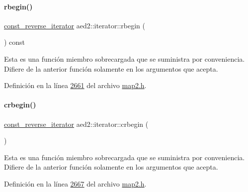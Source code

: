 \paragraph{\texorpdfstring{rbegin()}{rbegin()}\hspace{0.1cm}{\footnotesize\ttfamily [2/2]}}
{\footnotesize\ttfamily \hyperlink{classaed2_1_1iterator_a657402896e5b5966660032f5686cc4c4_a657402896e5b5966660032f5686cc4c4}{const\+\_\+reverse\+\_\+iterator} aed2\+::iterator\+::rbegin (\begin{DoxyParamCaption}{ }\end{DoxyParamCaption}) const\hspace{0.3cm}{\ttfamily [inline]}}

Esta es una función miembro sobrecargada que se suministra por conveniencia. Difiere de la anterior función solamente en los argumentos que acepta. 

Definición en la línea \hyperlink{map2_8h_source_l02661}{2661} del archivo \hyperlink{map2_8h_source}{map2.\+h}.

\mbox{\label{classaed2_1_1iterator_aa4b6ce667258581859351db42cfd3ee4_aa4b6ce667258581859351db42cfd3ee4}} 
\paragraph{\texorpdfstring{crbegin()}{crbegin()}}
{\footnotesize\ttfamily \hyperlink{classaed2_1_1iterator_a657402896e5b5966660032f5686cc4c4_a657402896e5b5966660032f5686cc4c4}{const\+\_\+reverse\+\_\+iterator} aed2\+::iterator\+::crbegin (\begin{DoxyParamCaption}{ }\end{DoxyParamCaption})\hspace{0.3cm}{\ttfamily [inline]}}

Esta es una función miembro sobrecargada que se suministra por conveniencia. Difiere de la anterior función solamente en los argumentos que acepta. 

Definición en la línea \hyperlink{map2_8h_source_l02667}{2667} del archivo \hyperlink{map2_8h_source}{map2.\+h}.

\mbox{\label{classaed2_1_1iterator_a0007a7962bc6aca8dca78c2a49bd581d_a0007a7962bc6aca8dca78c2a49bd581d}} 

